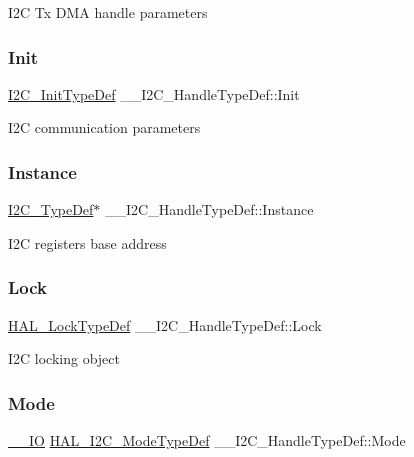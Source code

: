 I2C Tx D\+MA handle parameters \mbox{\label{struct_____i2_c___handle_type_def_a8e665bc833889975a33b10bebeab5db2}} 
\subsubsection{\texorpdfstring{Init}{Init}}
{\footnotesize\ttfamily \mbox{\hyperlink{struct_i2_c___init_type_def}{I2\+C\+\_\+\+Init\+Type\+Def}} \+\_\+\+\_\+\+I2\+C\+\_\+\+Handle\+Type\+Def\+::\+Init}

I2C communication parameters \mbox{\label{struct_____i2_c___handle_type_def_a080380e6051dd88c3a88c24aad4b10c0}} 
\subsubsection{\texorpdfstring{Instance}{Instance}}
{\footnotesize\ttfamily \mbox{\hyperlink{struct_i2_c___type_def}{I2\+C\+\_\+\+Type\+Def}}$\ast$ \+\_\+\+\_\+\+I2\+C\+\_\+\+Handle\+Type\+Def\+::\+Instance}

I2C registers base address \mbox{\label{struct_____i2_c___handle_type_def_a96ba2c1a4eee1bbbe791b29e81c4c013}} 
\subsubsection{\texorpdfstring{Lock}{Lock}}
{\footnotesize\ttfamily \mbox{\hyperlink{stm32f7xx__hal__def_8h_ab367482e943333a1299294eadaad284b}{H\+A\+L\+\_\+\+Lock\+Type\+Def}} \+\_\+\+\_\+\+I2\+C\+\_\+\+Handle\+Type\+Def\+::\+Lock}

I2C locking object \mbox{\label{struct_____i2_c___handle_type_def_a9e1687f431eaba605b2ae49c1e3ff641}} 
\subsubsection{\texorpdfstring{Mode}{Mode}}
{\footnotesize\ttfamily \mbox{\hyperlink{core__sc300_8h_aec43007d9998a0a0e01faede4133d6be}{\+\_\+\+\_\+\+IO}} \mbox{\hyperlink{group___h_a_l__mode__structure__definition_gabcbb7b844f2ffd63c4e530c117882062}{H\+A\+L\+\_\+\+I2\+C\+\_\+\+Mode\+Type\+Def}} \+\_\+\+\_\+\+I2\+C\+\_\+\+Handle\+Type\+Def\+::\+Mode}

